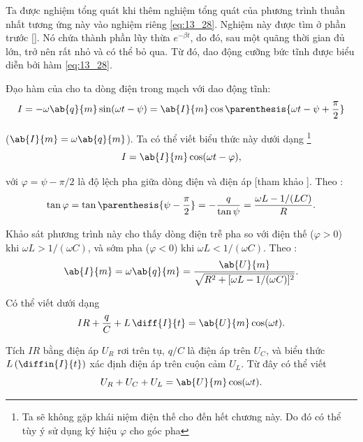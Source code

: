Ta được nghiệm tổng quát khi thêm nghiệm tổng quát của phương trình thuần nhất tương ứng này vào nghiệm riêng \eqref{eq:13_28}.
Nghiệm này được tìm ở phần trước [].
Nó chứa thành phần lũy thừa $e^{-\beta t}$, do đó, sau một quãng thời gian đủ lớn, trở nên rất nhỏ và có thể bỏ qua.
Từ đó, dao động cưỡng bức tĩnh được biểu diễn bởi hàm \eqref{eq:13_28}.

Đạo hàm của  cho ta dòng điện trong mạch với dao động tĩnh:
\begin{equation*}
    I = -\omega \ab{q}{m} \sin(\omega t - \psi) = \ab{I}{m} \cos\parenthesis{ \omega t - \psi + \frac{\pi}{2} }
\end{equation*}

\noindent
($\ab{I}{m}=\omega\ab{q}{m}$).
Ta có thể viết biểu thức này dưới dạng \footnote{Ta sẽ không gặp khái niệm điện thế cho đến hết chương này. Do đó có thể tùy ý sử dụng ký hiệu $\varphi$ cho góc pha}
\begin{equation}\label{eq:13_31}
    I = \ab{I}{m} \cos(\omega t - \varphi),
\end{equation}

\noindent
với $\varphi=\psi-\pi/2$ là độ lệch pha giữa dòng điện và điện áp [tham khảo ].
Theo :
\begin{equation}\label{eq:13_32}
    \tan\varphi = \tan\parenthesis{\psi - \frac{\pi}{2}} = - \frac{q}{\tan\psi} = \frac{\omega L - 1/(LC)}{R}.
\end{equation}

\noindent
Khảo sát phương trình này cho thấy dòng điện trễ pha so với điện thế ($\varphi>0$) khi $\omega L>1/(\omega C)$, và sớm pha  ($\varphi<0$) khi $\omega L<1/(\omega C)$.
Theo :
\begin{equation}\label{eq:13_33}
    \ab{I}{m} = \omega \ab{q}{m} = \frac{\ab{U}{m}}{\sqrt{R^2 + [\omega L - 1/(\omega C)]^2}}.
\end{equation}

\noindent
Có thể viết  dưới dạng
\begin{equation}\label{eq:13_34}
    IR + \frac{q}{C} + L\, \diff{I}{t} = \ab{U}{m} \cos(\omega t).
\end{equation}

\noindent
Tích $IR$ bằng điện áp $U_R$ rơi trên tụ, $q/C$ là điện áp trên $U_C$, và biểu thức $L\,(\diffin{I}{t})$ xác định điện áp trên cuộn cảm $U_L$.
Từ đây có thể viết
\begin{equation}\label{eq:13_35}
    U_R + U_C + U_L = \ab{U}{m} \cos(\omega t).
\end{equation}

